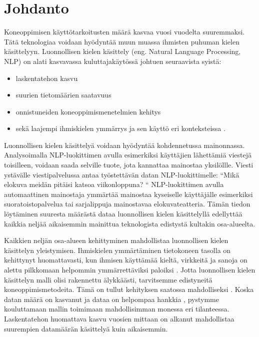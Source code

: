 \chapter{Johdanto\label{intro}}

Koneoppimisen käyttötarkoitusten määrä kasvaa vuosi vuodelta suuremmaksi. Tätä teknologiaa voidaan hyödyntää muun muassa ihmisten puhuman kielen käsittelyyn. Luonnollisen kielen käsittely (eng. Natural Language Processing, NLP) on alati kasvavassa kuluttajakäytössä johtuen seuraavista syistä:
\begin{itemize}
  \item laskentatehon kasvu
  \item suurien tietomäärien saatavuus
  \item onnistuneiden koneoppimismenetelmien kehitys
  \item sekä laajempi ihmiskielen ymmärrys ja sen käyttö eri konteksteissa \citep{doi:10.1126/science.aaa8685}.
\end{itemize}

Luonnollisen kielen käsittelyä voidaan hyödyntää kohdennetussa mainonnassa. Analysoimalla NLP-luokittimen avulla esimerkiksi käyttäjien lähettämiä viestejä toisilleen, voidaan saada selville tuote, jota kannattaa mainostaa yksilöllle. Viesti ystävälle viestipalvelussa antaa työstettävän datan NLP-luokittimelle: ``Mikä elokuva meidän pitäisi katsoa viikonloppuna? `` NLP-luokittimen avulla automaattinen mainostaja ymmärtää mainostaa kyseiselle käyttäjälle esimerkiksi suoratoistopalvelua tai sarjalippuja mainostavaa elokuvateatteria. Tämän tiedon löytäminen suuresta määrästä dataa luonnollisen kielen käsittelyllä edellyttää kaikkia neljää aikaisemmin mainittua teknologista edistystä kultakin osa-alueelta.

Kaikkien neljän osa-alueen kehittyminen mahdollistaa luonnollisen kielen käsittelyn yleistymisen. Ihmiskielen ymmärtäminen tietokoneen tasolla on kehittynyt huomattavasti, kun ihmisen käyttämää kieltä, virkkeitä ja sanoja on alettu pilkkomaan helpommin ymmärrettäviksi paloiksi \citep{https://doi.org/10.1002/aris.1440370103}. Jotta luonnollisen kielen käsittelyn malli olisi rakennettu älykkäästi, tarvitsemme edistyneitä koneoppimismetodeita. Tämä on tullut kehityksen saatossa mahdolliseksi \citep{jordan2015machine}. Koska datan määrä on kasvanut ja dataa on helpompaa hankkia \citep{gopalakrishnan2018deep}, pystymme kouluttamaan mallin toimimaan mahdollisimman monessa eri tilanteessa. Laskentatehon huomattava kasvu vuosien mittaan \citep{moore1965cramming} on alkanut mahdollistaa suurempien datamäärän käsittelyä kuin aikaisemmin.

